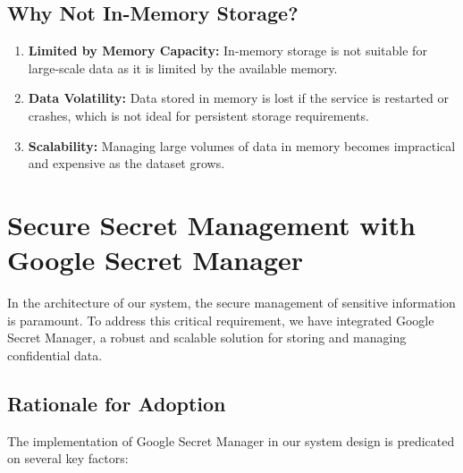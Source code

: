 \documentclass[a4paper, 12pt]{report}
\begin{document}
\subsection{Why Not In-Memory Storage?}
\begin{enumerate}
    \item \textbf{Limited by Memory Capacity:} In-memory storage is not suitable for large-scale data as it is limited by the available memory.
    \item \textbf{Data Volatility:} Data stored in memory is lost if the service is restarted or crashes, which is not ideal for persistent storage requirements.
    \item \textbf{Scalability:} Managing large volumes of data in memory becomes impractical and expensive as the dataset grows.
\end{enumerate}


\section{Secure Secret Management with Google Secret Manager}
In the architecture of our system, the secure management of sensitive information is paramount. To address this critical requirement, we have integrated Google Secret Manager, a robust and scalable solution for storing and managing confidential data.

\subsection{Rationale for Adoption}
The implementation of Google Secret Manager in our system design is predicated on several key factors:
\end{document}
